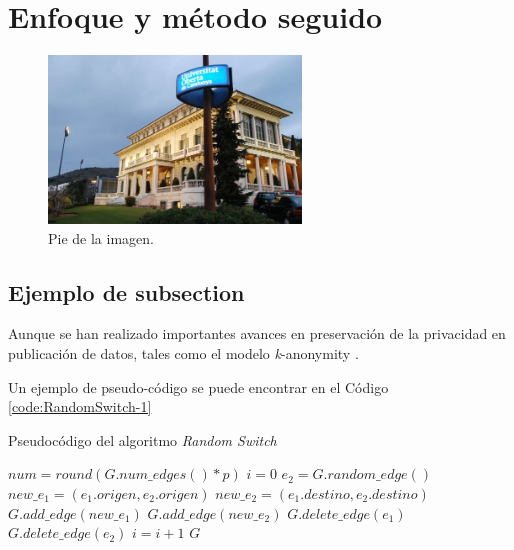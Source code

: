 \section{Enfoque y método seguido}




\begin{figure}
	\centering
	\includegraphics[width=0.6\textwidth]{figs/image1.png}
	\caption{Pie de la imagen.}
	\label{fig:context-anoni1}
\end{figure}

\subsection{Ejemplo de subsection}

Aunque se han realizado importantes avances en preservación de la privacidad en publicación de datos, tales como el modelo \textit{k}-anonymity \cite{Sweeney:2002}.

Un ejemplo de pseudo-código se puede encontrar en el Código \ref{code:RandomSwitch-1}

\begin{algorithm}
	\caption{Pseudocódigo del algoritmo \textit{Random Switch}}
	\label{code:RandomSwitch-1}
	\begin{algorithmic}
		\STATE $num = round(G.num\_edges() * p)$
		\STATE $i = 0$
		\STATE $e_{2} = G.random\_edge()$
		\STATE $new\_e_{1} = (e_{1}.origen, e_{2}.origen)$
		\STATE $new\_e_{2} = (e_{1}.destino, e_{2}.destino)$
		\STATE $G.add\_edge(new\_e_{1})$
		\STATE $G.add\_edge(new\_e_{2})$
		\STATE $G.delete\_edge(e_{1})$
		\STATE $G.delete\_edge(e_{2})$
		\STATE $i=i+1$
		\ENDIF
		\ENDWHILE
		\RETURN $G$
	\end{algorithmic}
\end{algorithm}

